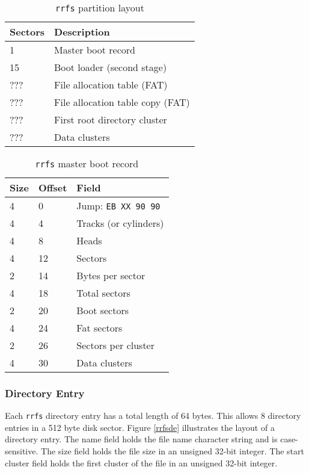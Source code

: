 \begin{table}[t] \begin{center}
\begin{tabular}{|l|l|} \hline
Sectors & Description \\ \hline \hline
1 & Master boot record \\ \hline
15 & Boot loader (second stage) \\ \hline
??? & File allocation table (FAT) \\ \hline
??? & File allocation table copy (FAT) \\ \hline
??? & First root directory cluster \\ \hline
??? & Data clusters \\ \hline
\end{tabular}
\caption{\label{rrfspart} {\tt rrfs} partition layout}
\end{center} \end{table}

\begin{table}[t] \begin{center}
\begin{tabular}{|l|l|l|} \hline
Size & Offset & Field \\ \hline \hline
4 & 0 & Jump: {\tt EB XX 90 90} \\ \hline
4 & 4 & Tracks (or cylinders) \\ \hline
4 & 8 & Heads \\ \hline
4 & 12 & Sectors \\ \hline
2 & 14 & Bytes per sector \\ \hline
4 & 18 & Total sectors \\ \hline
2 & 20 & Boot sectors \\ \hline
4 & 24 & Fat sectors \\ \hline
2 & 26 & Sectors per cluster \\ \hline
4 & 30 & Data clusters \\ \hline
\end{tabular}
\caption{\label{rrfsmbr} {\tt rrfs} master boot record}
\end{center} \end{table}


\subsubsection{Directory Entry}

Each {\tt rrfs} directory entry has a total length of 64
bytes.  This allows 8 directory entries in a 512 byte disk
sector.  Figure \ref{rrfsde} illustrates the layout of
a directory entry.  The name field holds the file name
character string and is case-sensitive.  The size field
holds the file size in an unsigned 32-bit integer.  The
start cluster field holds the first cluster of the file
in an unsigned 32-bit integer.

